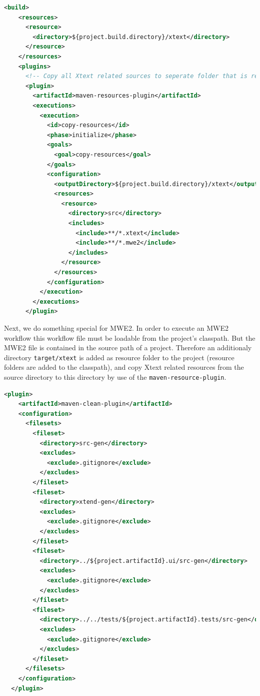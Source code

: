\begin{lstlisting}[language=XML]
  <build>
    <resources>
      <resource>
        <directory>${project.build.directory}/xtext</directory>
      </resource>
    </resources>
    <plugins>
      <!-- Copy all Xtext related sources to seperate folder that is registered as resource folder -->
      <plugin>
        <artifactId>maven-resources-plugin</artifactId>
        <executions>
          <execution>
            <id>copy-resources</id>
            <phase>initialize</phase>
            <goals>
              <goal>copy-resources</goal>
            </goals>
            <configuration>
              <outputDirectory>${project.build.directory}/xtext</outputDirectory>
              <resources>
                <resource>
                  <directory>src</directory>
                  <includes>
                    <include>**/*.xtext</include>
                    <include>**/*.mwe2</include>
                  </includes>
                </resource>
              </resources>
            </configuration>
          </execution>
        </executions>
      </plugin>
\end{lstlisting}

Next, we do something special for MWE2. In order to execute an MWE2 workflow
this workflow file must be loadable from the project's classpath. But the MWE2
file is contained in the source path of a project. Therefore an additionaly
directory \texttt{target/xtext} is added as resource folder to the project (resource
folders are added to the classpath), and copy Xtext related resources from the
source directory to this directory by use of the \texttt{maven-resource-plugin}.

\begin{lstlisting}[language=XML]
  <plugin>
    <artifactId>maven-clean-plugin</artifactId>
    <configuration>
      <filesets>
        <fileset>
          <directory>src-gen</directory>
          <excludes>
            <exclude>.gitignore</exclude>
          </excludes>
        </fileset>
        <fileset>
          <directory>xtend-gen</directory>
          <excludes>
            <exclude>.gitignore</exclude>
          </excludes>
        </fileset>
        <fileset>
          <directory>../${project.artifactId}.ui/src-gen</directory>
          <excludes>
            <exclude>.gitignore</exclude>
          </excludes>
        </fileset>
        <fileset>
          <directory>../../tests/${project.artifactId}.tests/src-gen</directory>
          <excludes>
            <exclude>.gitignore</exclude>
          </excludes>
        </fileset>
      </filesets>
    </configuration>
  </plugin>
\end{lstlisting}


